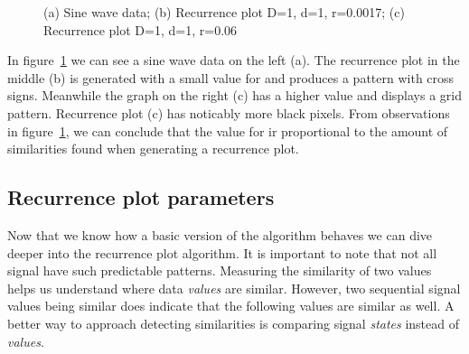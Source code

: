 \documentclass[a4paper,12pt,fleqn]{article}
\begin{document}
\begin{figure}[ht!]
  \hspace{\fill}
  \hspace{\fill}
  \caption{\label{fig:theory_sin}(a) Sine wave data; (b) Recurrence plot D=1, d=1, r=0.0017; (c) Recurrence plot D=1, d=1, r=0.06}
\end{figure}
In figure~\ref{fig:theory_sin} we can see a sine wave data on the left (a). 
The recurrence plot in the middle (b) is generated with a small value for  and produces a pattern with cross signs.
Meanwhile the graph on the right (c) has a higher  value and displays a grid pattern.
Recurrence plot (c) has noticably more black pixels.
From observations in figure~\ref{fig:theory_sin}, we can conclude that the value for  ir proportional to the amount of similarities found when generating a recurrence plot.

\subsection{Recurrence plot parameters}
Now that we know how a basic version of the algorithm behaves we can dive deeper into the recurrence plot algorithm.
It is important to note that not all signal have such predictable patterns.
Measuring the similarity of two values helps us understand where data \emph{values} are similar.
However, two sequential signal values being similar does indicate that the following values are similar as well.
A better way to approach detecting similarities is comparing signal \emph{states} instead of \emph{values}.
\end{document}

